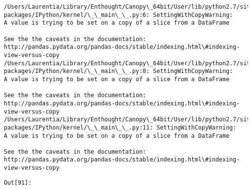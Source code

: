 \documentclass{article}
\begin{document}
    \begin{Verbatim}[commandchars=\\\{\}]
/Users/Laurentia/Library/Enthought/Canopy\_64bit/User/lib/python2.7/site-packages/IPython/kernel/\_\_main\_\_.py:6: SettingWithCopyWarning: 
A value is trying to be set on a copy of a slice from a DataFrame

See the the caveats in the documentation: http://pandas.pydata.org/pandas-docs/stable/indexing.html\#indexing-view-versus-copy
/Users/Laurentia/Library/Enthought/Canopy\_64bit/User/lib/python2.7/site-packages/IPython/kernel/\_\_main\_\_.py:8: SettingWithCopyWarning: 
A value is trying to be set on a copy of a slice from a DataFrame

See the the caveats in the documentation: http://pandas.pydata.org/pandas-docs/stable/indexing.html\#indexing-view-versus-copy
/Users/Laurentia/Library/Enthought/Canopy\_64bit/User/lib/python2.7/site-packages/IPython/kernel/\_\_main\_\_.py:11: SettingWithCopyWarning: 
A value is trying to be set on a copy of a slice from a DataFrame

See the the caveats in the documentation: http://pandas.pydata.org/pandas-docs/stable/indexing.html\#indexing-view-versus-copy
    \end{Verbatim}
\texttt{\color{outcolor}Out[{\color{outcolor}91}]:}
    
\end{document}
